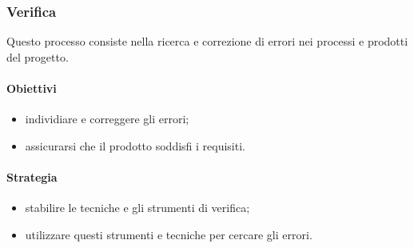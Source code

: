     \subsubsection{Verifica}
        Questo processo consiste nella ricerca e correzione di errori nei processi e prodotti del progetto.
        \paragraph{Obiettivi}
            \begin{itemize}
                \item individiare e correggere gli errori;
                \item assicurarsi che il prodotto soddisfi i requisiti.
            \end{itemize}
        \paragraph{Strategia}
            \begin{itemize}
                \item stabilire le tecniche e gli strumenti di verifica;
                \item utilizzare questi strumenti e tecniche per cercare gli errori.
            \end{itemize}
